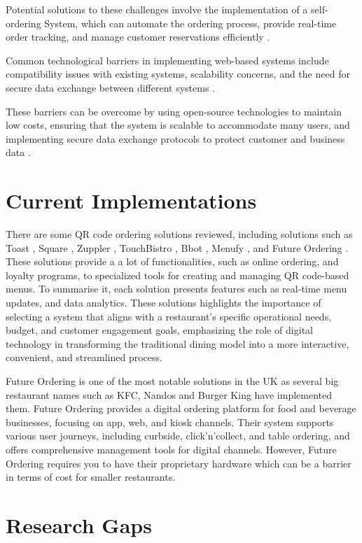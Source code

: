 Potential solutions to these challenges involve the implementation of a self-ordering System, which can automate the ordering process, provide real-time order tracking, and manage customer reservations efficiently \cite{7}.

Common technological barriers in implementing web-based systems include compatibility issues with existing systems, scalability concerns, and the need for secure data exchange between different systems \cite{2}.

These barriers can be overcome by using open-source technologies to maintain low costs, ensuring that the system is scalable to accommodate many users, and implementing secure data exchange protocols to protect customer and business data \cite{2}. 

\section{Current Implementations}
There are some QR code ordering solutions reviewed, including solutions such as Toast \cite{8}, Square \cite{9}, Zuppler \cite{10}, TouchBistro \cite{11}, Bbot \cite{12}, Menufy \cite{13}, and Future Ordering \cite{14}. These solutions provide a a lot of functionalities, such as online ordering, and loyalty programs, to specialized tools for creating and managing QR code-based menus. To summarise it, each solution presents features such as real-time menu updates, and data analytics. These solutions highlights the importance of selecting a system that aligns with a restaurant's specific operational needs, budget, and customer engagement goals, emphasizing the role of digital technology in transforming the traditional dining model into a more interactive, convenient, and streamlined process.

Future Ordering \cite{14} is one of the most notable solutions in the UK as several big restaurant names such as KFC, Nandos and Burger King have implemented them. Future Ordering provides a digital ordering platform for food and beverage businesses, focusing on app, web, and kiosk channels. Their system supports various user journeys, including curbside, click’n’collect, and table ordering, and offers comprehensive management tools for digital channels. However, Future Ordering requires you to have their proprietary hardware which can be a barrier in terms of cost for smaller restaurants.

\section{Research Gaps}

